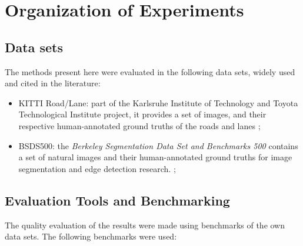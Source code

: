 \section{Organization of Experiments}

\subsection{Data sets}
\label{cap5_bases_dados}

The methods present here were evaluated in the following data sets, widely used and cited in the literature:

\begin{itemize}
 \item KITTI Road/Lane: part of the Karlsruhe Institute of Technology and Toyota Technological Institute project, it provides a set of images, and their respective human-annotated ground truths of the roads and lanes \cite{Fritsch2013ITSC}; %

 \item BSDS500: the \textit{Berkeley Segmentation Data Set and Benchmarks 500} contains a set of natural images and their human-annotated ground truths for image segmentation and edge detection research. \cite{amfm_pami2011}; %
 
\end{itemize}

\subsection{Evaluation Tools and Benchmarking}
\label{cap5_formas_avaliacao}

The quality evaluation of the results were made using benchmarks of the own data sets. %
The following benchmarks were used:

